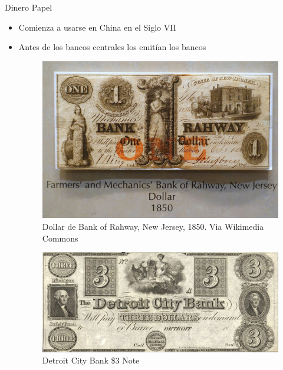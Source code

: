 \documentclass{beamer}
\begin{document}
\begin{frame}{Dinero Papel}
    \begin{itemize}
        \item Comienza a usarse en China en el Siglo VII
        \item Antes de los bancos centrales los emitían los bancos 
        
\begin{figure} [H]   
  \centering
  \includegraphics[width=.35\textwidth]{Slides Principios de Economia/Figures/C32.2.jpg}
      \caption{Dollar de Bank of Rahway, New Jersey, 1850. Via Wikimedia Commons}
  \label{fig:C32.2}
\end{figure}

\begin{figure} [H]   
  \centering
  \includegraphics[width=.35\textwidth]{Slides Principios de Economia/Figures/C32.3.jpeg}
      \caption{Detroit City Bank \$3 Note}
  \label{fig:C32.3}
\end{figure}
\end{itemize}
\end{frame}
        
\end{document}
